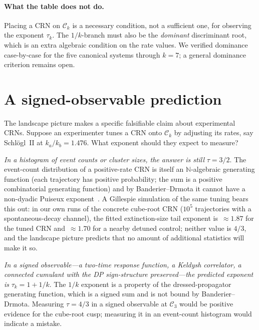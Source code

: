 \documentclass[11pt,a4paper]{article}
\newcommand{\NN}{\mathbb{N}}
\newcommand{\Ck}{\mathcal{C}}
\theoremstyle{plain}
\theoremstyle{remark}
\begin{document}
\paragraph{What the table does not do.}
Placing a CRN on $\Ck_{k}$ is a necessary condition, not a
sufficient one, for observing the exponent $\tau_{k}$.  The
$1/k$-branch must also be the \emph{dominant} discriminant root,
which is an extra algebraic condition on the rate values.  We
verified dominance case-by-case for the five canonical systems
through $k=7$; a general dominance criterion remains open.

\section{A signed-observable prediction}
\label{sec:signed}

The landscape picture makes a specific falsifiable claim about
experimental CRNs.  Suppose an experimenter tunes a CRN onto
$\Ck_{k}$ by adjusting its rates, say Schlögl~II at
$k_{a}/k_{b} = 1.476$.  What exponent should they expect to
measure?

\emph{In a histogram of event counts or cluster sizes, the
answer is still} $\tau=3/2$.  The event-count distribution of a
positive-rate CRN is itself an $\NN$-algebraic generating
function (each trajectory has positive probability; the sum is
a positive combinatorial generating function) and by
Banderier--Drmota it cannot have a non-dyadic Puiseux
exponent~\citep{BanderierDrmota2015}.  A Gillespie simulation
of the same tuning bears this out: in our own runs of the
concrete cube-root CRN ($10^{5}$ trajectories with a
spontaneous-decay channel), the fitted extinction-size tail
exponent is~$\approx 1.87$ for the tuned CRN and~$\approx 1.70$
for a nearby detuned control; neither value is $4/3$, and the
landscape picture predicts that no amount of additional
statistics will make it so.

\emph{In a signed observable---a two-time response function, a
Keldysh correlator, a connected cumulant with the DP
sign-structure preserved---the predicted exponent is}
$\tau_{k} = 1 + 1/k$.  The $1/k$ exponent is a property of the
dressed-propagator generating function, which is a signed sum
and is not bound by Banderier--Drmota.  Measuring $\tau = 4/3$
in a signed observable at $\Ck_{3}$ would be positive evidence
for the cube-root cusp; measuring it in an event-count histogram
would indicate a mistake.
\end{document}
